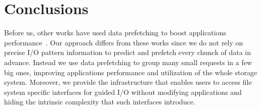 \documentclass[conference]{IEEEtran}
\begin{document}
\section{Conclusions}
\label{sec: conclusions}
Before us, other works have used data prefetching to boost applications performance~\cite{HEBTAGGMCS13, ChangG99, ChenBSTG08, VanDeBogartFK09, TranR04, BynaCST08, ChenR10, HEST12}. Our approach differs from these works since we do not rely on precise I/O pattern information to predict and prefetch every chunck of data in advance. Instead we use data prefetching to group many small requests in a few big ones, improving applications performance and utilization of the whole storage system. Moreover, we provide the infrastructure that enables users to access file system specific interfaces for guided I/O without modifying applications and hiding the intrinsic complexity that such interfaces introduce.




\end{document}
